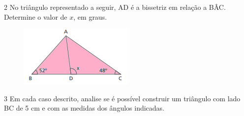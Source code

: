 \num{2} No triângulo representado a seguir, AD é a bissetriz em relação a
BÂC. Determine o valor de $x$, em graus.

\begin{minipage}{.5\textwidth}
\begin{figure}[H]
\includegraphics[width=2.20833in]{./imgSAEB_8_MAT/media/image14.png}
\end{figure}
\end{minipage}
\begin{minipage}{.5\textwidth}


\end{minipage}

\num{3} Em cada caso descrito, analise se é possível construir um triângulo
com lado BC de 5 cm e com as medidas dos ângulos indicadas.

